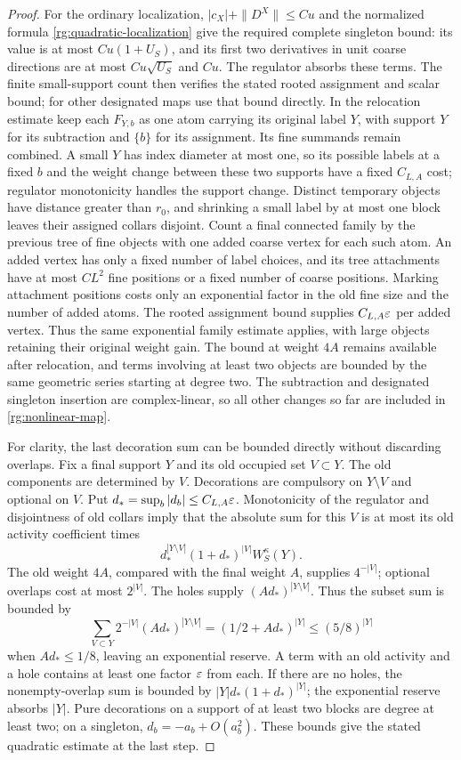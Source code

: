 \begin{proof}
For the ordinary localization, $|c_X|+\|D^X\|\le Cu$ and the normalized formula \eqref{rg:quadratic-localization} give the required complete singleton bound: its value is at most $Cu(1+U_S)$, and its first two derivatives in unit coarse directions are at most $Cu\sqrt{U_S}$ and $Cu$.  The regulator absorbs these terms.  The finite small-support count then verifies the stated rooted assignment and scalar bound; for other designated maps use that bound directly.  In the relocation estimate keep each $F_{Y,b}$ as one atom carrying its original label $Y$, with support $Y$ for its subtraction and $\{b\}$ for its assignment.  Its fine summands remain combined.  A small $Y$ has index diameter at most one, so its possible labels at a fixed $b$ and the weight change between these two supports have a fixed $C_{L,A}$ cost; regulator monotonicity handles the support change.  Distinct temporary objects have distance greater than $r_0$, and shrinking a small label by at most one block leaves their assigned collars disjoint.  Count a final connected family by the previous tree of fine objects with one added coarse vertex for each such atom.  An added vertex has only a fixed number of label choices, and its tree attachments have at most $CL^2$ fine positions or a fixed number of coarse positions.  Marking attachment positions costs only an exponential factor in the old fine size and the number of added atoms.  The rooted assignment bound supplies $C_{L,A}\varepsilon$ per added vertex.  Thus the same exponential family estimate applies, with large objects retaining their original weight gain.  The bound at weight $4A$ remains available after relocation, and terms involving at least two objects are bounded by the same geometric series starting at degree two.  The subtraction and designated singleton insertion are complex-linear, so all other changes so far are included in \eqref{rg:nonlinear-map}.

For clarity, the last decoration sum can be bounded directly without discarding overlaps.  Fix a final support $Y$ and its old occupied set $V\subset Y$.  The old components are determined by $V$.  Decorations are compulsory on $Y\setminus V$ and optional on $V$.  Put $d_* =\sup_b|d_b|\le C_{L,A}\varepsilon$.  Monotonicity of the regulator and disjointness of old collars imply that the absolute sum for this $V$ is at most its old activity coefficient times
\[
 d_*^{|Y\setminus V|}(1+d_*)^{|V|}W_S^\kappa(Y).
\]
The old weight $4A$, compared with the final weight $A$, supplies $4^{-|V|}$; optional overlaps cost at most $2^{|V|}$.  The holes supply $(Ad_*)^{|Y\setminus V|}$.  Thus the subset sum is bounded by
\[
 \sum_{V\subset Y}2^{-|V|}(Ad_*)^{|Y\setminus V|}
 =(1/2+Ad_*)^{|Y|}\le(5/8)^{|Y|}
\]
when $Ad_*\le1/8$, leaving an exponential reserve.  A term with an old activity and a hole contains at least one factor $\varepsilon$ from each.  If there are no holes, the nonempty-overlap sum is bounded by $|Y|d_*(1+d_*)^{|Y|}$; the exponential reserve absorbs $|Y|$.  Pure decorations on a support of at least two blocks are degree at least two; on a singleton, $d_b=-a_b+O(a_b^2)$.  These bounds give the stated quadratic estimate at the last step.


\end{proof}
